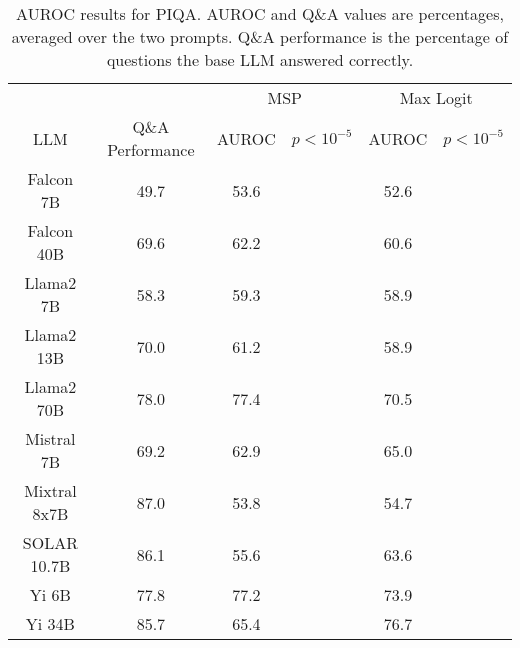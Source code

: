 \begin{table*}
\centering
\begin{tabular}{c|c|c|c|c|c}
& & \multicolumn{2}{c|}{MSP} & \multicolumn{2}{c}{Max Logit} \\ 
LLM & Q\&A Performance & AUROC & $p < 10^{-5}$ & AUROC & $p < 10^{-5}$\\ \hline
Falcon 7B & 49.7 & 53.6 &  & 52.6 & \\
Falcon 40B & 69.6 & 62.2 &  & 60.6 & \\
Llama2 7B & 58.3 & 59.3 &  & 58.9 & \\
Llama2 13B & 70.0 & 61.2 &  & 58.9 & \\
Llama2 70B & 78.0 & 77.4 &  & 70.5 & \\
Mistral 7B & 69.2 & 62.9 &  & 65.0 & \\
Mixtral 8x7B & 87.0 & 53.8 &  & 54.7 & \\
SOLAR 10.7B & 86.1 & 55.6 &  & 63.6 & \\
Yi 6B & 77.8 & 77.2 &  & 73.9 & \\
Yi 34B & 85.7 & 65.4 &  & 76.7 & \\
\hline
\end{tabular}
\caption{AUROC results for PIQA. AUROC and Q\&A values are percentages, averaged over the two prompts. Q\&A performance is the percentage of questions the base LLM answered correctly.}
\label{tab:piqa_auroc}
\end{table*}
